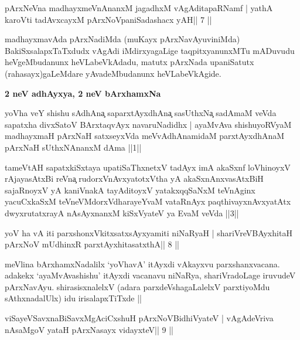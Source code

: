 
\begin{shl}
pArxNeVna madhayxmeVnAnanxM jagadhxM vAgAditapaRNamf |
yathA karoVti tadAvxcayxM pArxNoVpaniSadashacx yAH\hfill || 7 ||
\end{shl}

\begin{artha}
madhayxmavAda pArxNadiMda (muKayx pArxNavAyuviniMda) BakiSxsalapxTaTxdudx vAgAdi iMdirxyagaLige taqpitxyanunxMTu mADuvudu heVgeMbudanunx heVLabeVkAdadu, matutx pArxNada upaniSatutx (rahasayx)gaLeMdare yAvadeMbudanunx heVLabeVkAgide.
\end{artha}

\newpage
\medskip
\centerline{\textbf{2 neV adhAyxya, 2 neV bArxhamxNa}}

\begin{shl}
yoVha veY shishu sAdhAna{\c} saparxtAyxdhAna{\c} sasUthxNa{\c} sadAmaM veVda
sapatxha divxSatoV BArxtaqvAyx navaruNadidhx | ayaMvAva shishuyoRVyaM
madhayxmaH pArxNaH satxseyxVda meVvAdhAnamidaM parxtAyxdhAnaM pArxNaH
sUthxNAnanxM dAma ||1|| 
\end{shl}

\begin{shl}
tameVtAH sapatxkiSxtaya upatiSaThxnetxV tadAyx
imA akaSxnf loVhinoyxV rAjayasAtxBi reVna{\c} rudorxV\s nAvxyatotxV\s tha
yA akaSxnAnxvasAtxBiH sajaRnoyxV yA kaniVnakA tayAditoyxV
yatakxqqSaNxM teVnAginx yacuCxkaSxM teVneVMdorxV\s dharayeYvaM
vataRnAyx paqthivayxnAvxyatAtx dwyxrutatxrayA nAsAyxnanxM kiSxVyateV
ya EvaM veVda ||3||
\end{shl}

\begin{shl}
yoV ha vA iti parxshonxVkitxsatxsAyxyamiti niNaRyaH |
shariVreV\s BAyxhitaH pArxNoV mUdhinxR parxtAyxhitasatxthA\hfill || 8 ||
\end{shl}

\begin{artha}
meVlina bArxhamxNadalilx `yoVhavA' itAyxdi vAkayxvu parxshanxvacana.
adakekx `ayaMvAvashishu' itAyxdi vacanavu niNaRya, shariVradoLage
iruvudeV pArxNavAyu. shirasisxnalelxV (adara parxdeVshagaLalelxV
parxtiyoMdu sAthxnadalUlx) idu irisalapxTiTxde ||
\end{artha}

\begin{shl}
viSayeVSavxnaBiSavxMgAciCxshuH  pArxNoV\s BidhiVyateV |
vAgAdeVriva nA\s\s saMgoV yataH pArxNasayx vidayxteV\hfill || 9 ||
\end{shl}

